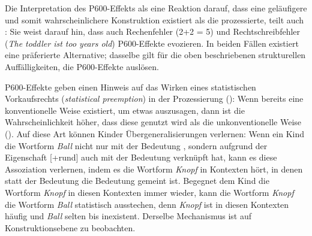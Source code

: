 Die Interpretation des P600-Effekts als eine Reaktion darauf, dass eine geläufigere und somit wahrscheinlichere Konstruktion existiert als die prozessierte, teilt auch \textcite[83--84]{Goldberg.2019}: Sie weist darauf hin, dass auch Rechenfehler (2+2 = 5) und Rechtschreibfehler (\textit{The toddler ist too years old}) P600-Effekte evozieren. In beiden Fällen existiert eine präferierte Alternative; dasselbe gilt für die oben beschriebenen strukturellen Auffälligkeiten, die P600-Effekte auslösen. 

\begin{sloppypar}
P600-Effekte geben einen Hinweis auf das Wirken eines statistischen Vorkaufsrechts (\textit{statistical preemption}) in der Prozessierung (\cite[83--84]{Goldberg.2019}): Wenn bereits eine konventionelle Weise existiert, um etwas auszusagen, dann ist die Wahrscheinlichkeit höher, dass diese genutzt wird als die unkonventionelle Weise (\cite[86]{Goldberg.2019}). Auf diese Art können Kinder Übergeneralisierungen verlernen: Wenn ein Kind die Wortform \textit{Ball} nicht nur mit der Bedeutung , sondern aufgrund der Eigenschaft [+rund] auch mit der Bedeutung  verknüpft hat, kann es diese Assoziation verlernen, indem es die Wortform \textit{Knopf} in Kontexten hört, in denen statt der Bedeutung  die Bedeutung  gemeint ist. Begegnet dem Kind die Wortform \textit{Knopf} in diesen Kontexten immer wieder, kann die Wortform \textit{Knopf} die Wortform \textit{Ball} statistisch ausstechen, denn \textit{Knopf} ist in diesen Kontexten häufig und \textit{Ball} selten bis inexistent. Derselbe Mechanismus ist auf Konstruktionsebene zu beobachten.
\end{sloppypar}

